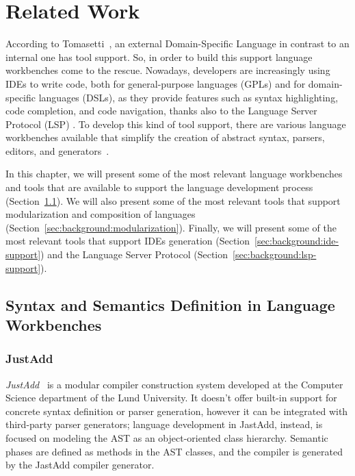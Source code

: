 \chapter{Related Work}\label{chap:RelatedWork}

According to Tomasetti~\cite{tomassetti_complete_2017}, an external Domain-Specific Language in contrast to an internal one has tool support. So, in order to build this support language workbenches come to the rescue.
Nowadays, developers are increasingly using IDEs to write code, both for general-purpose languages (GPLs) and for domain-specific languages (DSLs), as they provide features such as syntax highlighting, code completion, and code navigation, thanks also to the Language Server Protocol (LSP) \cite{Rodriguez-Echeverria18a}.
To develop this kind of tool support, there are various language workbenches available that simplify the creation of abstract syntax, parsers, editors, and generators~\cite{Fowler05}.

In this chapter, we will present some of the most relevant language workbenches and tools that are available to support the language development process (Section~\ref{sec:background:syntax-semantics}). We will also present some of the most relevant tools that support modularization and composition of languages (Section~\ref{sec:background:modularization}). Finally, we will present some of the most relevant tools that support IDEs generation (Section~\ref{sec:background:ide-support}) and the Language Server Protocol (Section~\ref{sec:background:lsp-support}).

\section{Syntax and Semantics Definition in Language Workbenches}\label{sec:background:syntax-semantics}

\subsection{JustAdd}\label{subsec:background:justadd}

\textit{JustAdd}~\cite{Ekman07b} is a modular compiler construction system developed at the Computer Science department of the Lund University.
It doesn’t offer built-in support for concrete syntax definition or parser generation, however it can be integrated with third-party parser generators; language development in JastAdd, instead, is focused on modeling the AST as an object-oriented class hierarchy. Semantic phases are defined as methods in the AST classes, and the compiler is generated by the JastAdd compiler generator.

